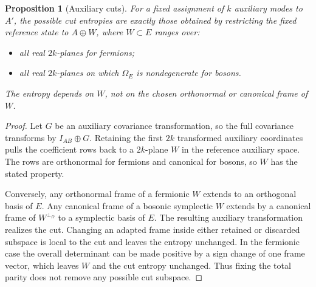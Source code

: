 \documentclass[11pt,a4paper]{article}
\numberwithin{equation}{section}
\newtheorem{proposition}[theorem]{Proposition}
\theoremstyle{remark}
\begin{document}
\begin{proposition}[Auxiliary cuts]\label{prop:cuts}
For a fixed assignment of $k$ auxiliary modes to $A'$, the possible cut entropies are exactly those obtained by restricting the fixed reference state to $A\oplus W$, where $W\subset E$ ranges over:
\begin{itemize}
 \item all real $2k$-planes for fermions;
 \item all real $2k$-planes on which $\Omega_E$ is nondegenerate for bosons.
\end{itemize}
The entropy depends on $W$, not on the chosen orthonormal or canonical frame of $W$.
\end{proposition}
\begin{proof}
Let $G$ be an auxiliary covariance transformation, so the full covariance transforms by $I_{AB}\oplus G$. Retaining the first $2k$ transformed auxiliary coordinates pulls the coefficient rows back to a $2k$-plane $W$ in the reference auxiliary space. The rows are orthonormal for fermions and canonical for bosons, so $W$ has the stated property.

Conversely, any orthonormal frame of a fermionic $W$ extends to an orthogonal basis of $E$. Any canonical frame of a bosonic symplectic $W$ extends by a canonical frame of $W^{\perp_\Omega}$ to a symplectic basis of $E$. The resulting auxiliary transformation realizes the cut. Changing an adapted frame inside either retained or discarded subspace is local to the cut and leaves the entropy unchanged. In the fermionic case the overall determinant can be made positive by a sign change of one frame vector, which leaves $W$ and the cut entropy unchanged. Thus fixing the total parity does not remove any possible cut subspace.
\end{proof}
\end{document}
